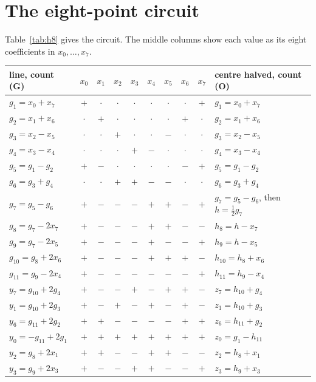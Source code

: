 \documentclass[10pt]{article}
\theoremstyle{remark}
\newcommand{\cntG}{\textup{(G)}}
\newcommand{\cntO}{\textup{(O)}}
\newcommand{\p}{$+$}
\newcommand{\m}{$-$}
\newcommand{\z}{$\cdot$}
\begin{document}
\section{The eight-point circuit}\label{sec:eight}

Table~\ref{tab:h8} gives the circuit. The middle columns show each value as its eight coefficients in
$x_0,\dots,x_7$.

\begin{table}[ht]
\centering
\small
\setlength{\tabcolsep}{4.2pt}
\begin{tabular}{@{}l@{\qquad}cccccccc@{\qquad}l@{}}
\toprule
line, count \cntG & $x_0$ & $x_1$ & $x_2$ & $x_3$ & $x_4$ & $x_5$ & $x_6$ & $x_7$ & centre halved, count \cntO\\
\midrule
$g_{1}=x_{0}+x_{7}$ & \p&\z&\z&\z&\z&\z&\z&\p & $g_{1}=x_{0}+x_{7}$\\
$g_{2}=x_{1}+x_{6}$ & \z&\p&\z&\z&\z&\z&\p&\z & $g_{2}=x_{1}+x_{6}$\\
$g_{3}=x_{2}-x_{5}$ & \z&\z&\p&\z&\z&\m&\z&\z & $g_{3}=x_{2}-x_{5}$\\
$g_{4}=x_{3}-x_{4}$ & \z&\z&\z&\p&\m&\z&\z&\z & $g_{4}=x_{3}-x_{4}$\\
$g_{5}=g_{1}-g_{2}$ & \p&\m&\z&\z&\z&\z&\m&\p & $g_{5}=g_{1}-g_{2}$\\
$g_{6}=g_{3}+g_{4}$ & \z&\z&\p&\p&\m&\m&\z&\z & $g_{6}=g_{3}+g_{4}$\\
$g_{7}=g_{5}-g_{6}$ & \p&\m&\m&\m&\p&\p&\m&\p & $g_{7}=g_{5}-g_{6}$, then $h=\tfrac12 g_{7}$\\
\midrule
$g_{8}=g_{7}-2x_{7}$ & \p&\m&\m&\m&\p&\p&\m&\m & $h_{8}=h-x_{7}$\\
$g_{9}=g_{7}-2x_{5}$ & \p&\m&\m&\m&\p&\m&\m&\p & $h_{9}=h-x_{5}$\\
$g_{10}=g_{8}+2x_{6}$ & \p&\m&\m&\m&\p&\p&\p&\m & $h_{10}=h_{8}+x_{6}$\\
$g_{11}=g_{9}-2x_{4}$ & \p&\m&\m&\m&\m&\m&\m&\p & $h_{11}=h_{9}-x_{4}$\\
$y_{7}=g_{10}+2g_{4}$ & \p&\m&\m&\p&\m&\p&\p&\m & $z_{7}=h_{10}+g_{4}$\\
$y_{1}=g_{10}+2g_{3}$ & \p&\m&\p&\m&\p&\m&\p&\m & $z_{1}=h_{10}+g_{3}$\\
$y_{6}=g_{11}+2g_{2}$ & \p&\p&\m&\m&\m&\m&\p&\p & $z_{6}=h_{11}+g_{2}$\\
$y_{0}=-g_{11}+2g_{1}$ & \p&\p&\p&\p&\p&\p&\p&\p & $z_{0}=g_{1}-h_{11}$\\
$y_{2}=g_{8}+2x_{1}$ & \p&\p&\m&\m&\p&\p&\m&\m & $z_{2}=h_{8}+x_{1}$\\
$y_{3}=g_{9}+2x_{3}$ & \p&\m&\m&\p&\p&\m&\m&\p & $z_{3}=h_{9}+x_{3}$\\

\end{tabular}
\end{table}
\end{document}
